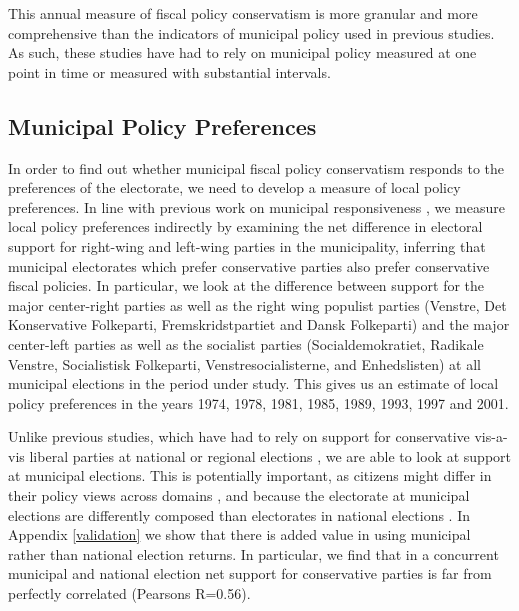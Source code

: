 \documentclass[a4paper,12pt]{article}
\begin{document}
This annual measure of fiscal policy conservatism is more granular and more comprehensive than the indicators of municipal policy used in previous studies. As such, these studies have had to rely on municipal policy measured at one point in time \citep{tausanovitch2014representation,palus2010responsiveness} or measured with substantial intervals\citep{sances2017voters,einstein2016pushing,hajnal2010or}. 



\subsection*{Municipal Policy Preferences}

In order to find out whether municipal fiscal policy conservatism responds to the preferences of the electorate, we need to develop a measure of local policy preferences. In line with previous work on municipal responsiveness \cite[e.g.,][]{sances2017ideology,einstein2016pushing}, we measure local policy preferences indirectly by examining the net difference in electoral support for right-wing and left-wing parties in the municipality, inferring that municipal electorates which prefer conservative parties also prefer conservative fiscal policies. In particular, we look at the difference between support for the major center-right parties as well as the right wing populist parties (Venstre, Det Konservative Folkeparti, Fremskridstpartiet and Dansk Folkeparti) and the major center-left parties as well as the socialist parties (Socialdemokratiet, Radikale Venstre, Socialistisk Folkeparti, Venstresocialisterne, and Enhedslisten) at all municipal elections in the period under study. This gives us an estimate of local policy preferences in the years 1974, 1978, 1981, 1985, 1989, 1993, 1997 and 2001.

 Unlike previous studies, which have had to rely on support for conservative vis-a-vis liberal parties at national or regional elections \citep[e.g.,][]{hajnal2010or,einstein2016pushing}, we are able to look at support at municipal elections. This is potentially important, as citizens might differ in their policy views across domains \cite[for an argument along these lines, see]{abrams2012big}, and because the electorate at municipal elections are differently composed than electorates in national elections \citep{ansolabehere2015beyond,hansen2017social}. In Appendix  \ref{validation} we show that there is added value in using municipal rather than national election returns. In particular, we find that in a concurrent municipal and national election net support for conservative parties is far from perfectly correlated (Pearsons R=0.56).
 
\end{document}
